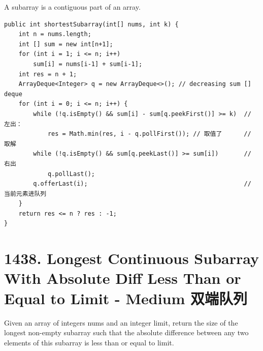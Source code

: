 \documentclass[9pt, b5paaper]{book}
\begin{document}
A subarray is a contiguous part of an array.
\begin{verbatim}
public int shortestSubarray(int[] nums, int k) { 
    int n = nums.length;
    int [] sum = new int[n+1];  
    for (int i = 1; i <= n; i++)  
        sum[i] = nums[i-1] + sum[i-1];
    int res = n + 1;
    ArrayDeque<Integer> q = new ArrayDeque<>(); // decreasing sum [] deque
    for (int i = 0; i <= n; i++) {
        while (!q.isEmpty() && sum[i] - sum[q.peekFirst()] >= k)  // 左出：
            res = Math.min(res, i - q.pollFirst()); // 取值了      // 取解
        while (!q.isEmpty() && sum[q.peekLast()] >= sum[i])       // 右出
            q.pollLast();  
        q.offerLast(i);                                           // 当前元素进队列
    }
    return res <= n ? res : -1;
}
\end{verbatim}

\section{1438. Longest Continuous Subarray With Absolute Diff Less Than or Equal to Limit - Medium 双端队列}
\label{sec-12-6}
Given an array of integers nums and an integer limit, return the size of the longest non-empty subarray such that the absolute difference between any two elements of this subarray is less than or equal to limit.
\end{document}
